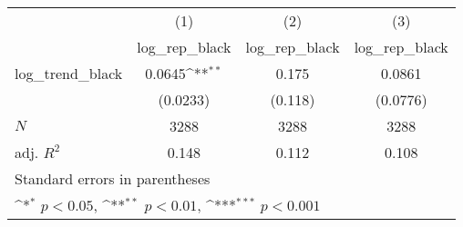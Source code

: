 {
\def\sym#1{\ifmmode^{#1}\else\(^{#1}\)\fi}
\begin{tabular}{l*{3}{c}}
\hline\hline
            &\multicolumn{1}{c}{(1)}&\multicolumn{1}{c}{(2)}&\multicolumn{1}{c}{(3)}\\
            &\multicolumn{1}{c}{log\_rep\_black}&\multicolumn{1}{c}{log\_rep\_black}&\multicolumn{1}{c}{log\_rep\_black}\\
\hline
log\_trend\_black&      0.0645\sym{**} &       0.175         &      0.0861         \\
            &    (0.0233)         &     (0.118)         &    (0.0776)         \\
\hline
\(N\)       &        3288         &        3288         &        3288         \\
adj. \(R^{2}\)&       0.148         &       0.112         &       0.108         \\
\hline\hline
\multicolumn{4}{l}{\footnotesize Standard errors in parentheses}\\
\multicolumn{4}{l}{\footnotesize \sym{*} \(p<0.05\), \sym{**} \(p<0.01\), \sym{***} \(p<0.001\)}\\
\end{tabular}
}
